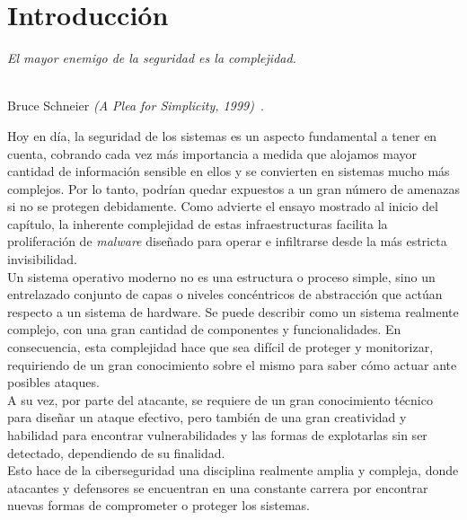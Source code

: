 \chapter{Introducción}
\label{cap:capitulo1}
\setcounter{page}{1}

\begin{flushright}
\begin{minipage}[]{10cm}
\emph{\guillemotleft El mayor enemigo de la seguridad es la complejidad.\guillemotright}\\
\end{minipage}\\

Bruce Schneier \textit{(A Plea for Simplicity, 1999)}~\cite{schneier}.
\end{flushright}

\vspace{1cm}

Hoy en día, la seguridad de los sistemas es un aspecto fundamental a tener en cuenta, cobrando cada vez más importancia a medida que alojamos mayor cantidad de información sensible en ellos y se convierten en sistemas mucho más complejos. Por lo tanto, podrían quedar expuestos a un gran número de amenazas si no se protegen debidamente.
Como advierte el ensayo mostrado al inicio del capítulo, la inherente complejidad de estas infraestructuras facilita la proliferación de \textit{malware} diseñado para operar e infiltrarse desde la más estricta invisibilidad.\\

Un sistema operativo moderno no es una estructura o proceso simple, sino un entrelazado conjunto de capas o niveles concéntricos de abstracción que actúan respecto a un sistema de hardware. Se puede describir como un sistema realmente complejo, con una gran cantidad de componentes y funcionalidades. En consecuencia, esta complejidad hace que sea difícil de proteger y monitorizar, requiriendo de un gran conocimiento sobre el mismo para saber cómo actuar ante posibles ataques.\\

A su vez, por parte del atacante, se requiere de un gran conocimiento técnico para diseñar un ataque efectivo, pero también de una gran creatividad y habilidad para encontrar vulnerabilidades y las formas de explotarlas sin ser detectado, dependiendo de su finalidad.\\

Esto hace de la ciberseguridad una disciplina realmente amplia y compleja, donde atacantes y defensores se encuentran en una constante carrera por encontrar nuevas formas de comprometer o proteger los sistemas.\\

